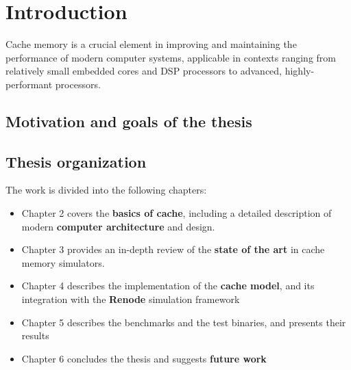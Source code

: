 
\chapter{Introduction}
Cache memory is a crucial element in improving and maintaining the performance
of modern computer systems, applicable in contexts ranging from relatively small
embedded cores and DSP processors to advanced, highly-performant processors.
%

\section{Motivation and goals of the thesis}
%

\section{Thesis organization}
The work is divided into the following chapters:
\begin{itemize}
  \item Chapter 2 covers the \textbf{basics of cache}, including a detailed description of modern \textbf{computer architecture} and design.
  \item Chapter 3 provides an in-depth review of the \textbf{state of the art} in cache memory simulators.
  \item Chapter 4 describes the implementation of the \textbf{cache model}, and its integration with the \textbf{Renode} simulation framework
  \item Chapter 5 describes the benchmarks and the test binaries, and presents their results
  \item Chapter 6 concludes the thesis and suggests \textbf{future work}
\end{itemize}

